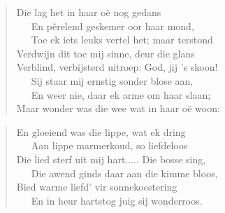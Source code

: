 \begin{verse}
Die lag het in haar oë nog gedans \\ 
\ \ \ En pêrelend geskemer oor haar mond, \\ 
\ \ \ Toe ek iets leuks vertel het; maar terstond \\ 
Verdwijn dit toe mij sinne, deur die glans \\ 
Verblind, verbijsterd uitroep: God, jij ’s skoon! \\ 
\ \ \ Sij staar mij ernstig sonder blose aan, \\ 
\ \ \ En weer nie, daar ek arme om haar slaan; \\ 
Maar wonder was die wee wat in haar oë woon: \\ 
\end{verse}

\begin{verse}
En gloeiend was die lippe, wat ek dring \\ 
\ \ \ Aan lippe marmerkoud, so liefdeloos \\ 
Die lied sterf uit mij hart..... Die bosse sing, \\ 
\ \ \ Die awend ginds daar aan die kimme bloos, \\ 
Bied warme liefd’ vir sonnekoestering \\ 
\ \ \ En in heur hartstog juig sij wonderroos. \\ 
\end{verse}
